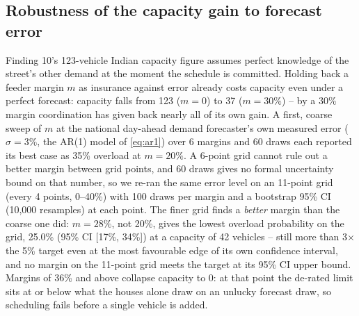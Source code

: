\documentclass[journal]{IEEEtran}
\begin{document}
\subsection{Robustness of the capacity gain to forecast error}
Finding 10's 123-vehicle Indian capacity figure assumes perfect knowledge of the street's other demand at the moment the schedule is committed. Holding back a feeder margin $m$ as insurance against error already costs capacity even under a perfect forecast: capacity falls from 123 ($m=0$) to 37 ($m=30\%$) -- by a 30\% margin coordination has given back nearly all of its own gain. A first, coarse sweep of $m$ at the national day-ahead demand forecaster's own measured error ($\sigma=3\%$, the AR(1) model of \eqref{eq:ar1}) over 6 margins and 60 draws each reported its best case as 35\% overload at $m=20\%$. A 6-point grid cannot rule out a better margin between grid points, and 60 draws gives no formal uncertainty bound on that number, so we re-ran the same error level on an 11-point grid (every 4 points, 0--40\%) with 100 draws per margin and a bootstrap 95\% CI (10,000 resamples) at each point. The finer grid finds a \emph{better} margin than the coarse one did: $m=28\%$, not 20\%, gives the lowest overload probability on the grid, 25.0\% (95\% CI [17\%, 34\%]) at a capacity of 42 vehicles -- still more than 3$\times$ the 5\% target even at the most favourable edge of its own confidence interval, and no margin on the 11-point grid meets the target at its 95\% CI upper bound. Margins of 36\% and above collapse capacity to 0: at that point the de-rated limit sits at or below what the houses alone draw on an unlucky forecast draw, so scheduling fails before a single vehicle is added.
\end{document}
